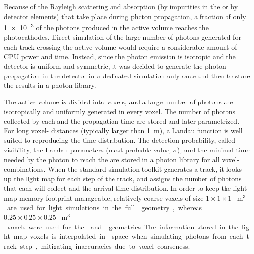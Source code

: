 Because of the Rayleigh scattering and absorption (by impurities in the \lar or by detector elements) that take place during photon propagation, a fraction of only \num{1e-3}  of the photons produced in the \lar active volume reaches the  photocathodes. Direct simulation of the large number of photons generated for each track crossing the active volume would require a considerable amount of CPU power and time. %
Instead, since the photon emission is isotropic and the detector is uniform and symmetric, it was decided to generate the photon propagation in the detector in a dedicated  simulation only once and then to store the results in a photon library.

The active volume is divided into voxels, and a large number of photons are isotropically and uniformly generated in every voxel. The number of photons collected by each  and the propagation time are stored and later parametrized. For long voxel- distances (typically larger than \SI{1}{\m}), a Landau function is well suited to reproducing the time distribution. The detection probability, called visibility, the Landau parameters (most probable value, $\sigma$), and the minimal time needed by the photon to reach the  are stored in a photon library for all voxel- combinations. %
When the standard \dual {} simulation toolkit generates a track, it looks up the light map for each step of the track, and assigns the number of photons that each  will collect and the arrival time distribution. %
In order to keep the light map memory footprint manageable, relatively coarse voxels of size $1\times 1\times 1$ \SI{}{m$^3$} are used for light simulations in the full  geometry, whereas $0.25\times 0.25\times 0.25$ \SI{}{m$^3$} voxels were used for the  and  geometries. The information stored in the light map voxels is interpolated in \threed space when simulating photons from each track step,  mitigating inaccuracies due to voxel coarseness.

